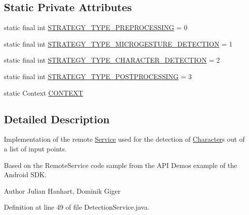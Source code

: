 \subsection*{Static Private Attributes}
\begin{DoxyCompactItemize}
\item 
static final int \hyperlink{classch_1_1zhaw_1_1ba10__bsha__1_1_1service_1_1DetectionService_a618391553bffc271f3d62fc4b1705c34}{STRATEGY\_\-TYPE\_\-PREPROCESSING} = 0
\item 
static final int \hyperlink{classch_1_1zhaw_1_1ba10__bsha__1_1_1service_1_1DetectionService_acc8c85d6fe896611e64180360f6150b3}{STRATEGY\_\-TYPE\_\-MICROGESTURE\_\-DETECTION} = 1
\item 
static final int \hyperlink{classch_1_1zhaw_1_1ba10__bsha__1_1_1service_1_1DetectionService_a79f9a08bcebfb07d97dad403931d011d}{STRATEGY\_\-TYPE\_\-CHARACTER\_\-DETECTION} = 2
\item 
static final int \hyperlink{classch_1_1zhaw_1_1ba10__bsha__1_1_1service_1_1DetectionService_a0a5532caf09d48e950372c1b0de3e328}{STRATEGY\_\-TYPE\_\-POSTPROCESSING} = 3
\item 
static Context \hyperlink{classch_1_1zhaw_1_1ba10__bsha__1_1_1service_1_1DetectionService_a0e249aa466d4da8bcac9f75942129aa6}{CONTEXT}
\end{DoxyCompactItemize}


\subsection{Detailed Description}
Implementation of the remote \hyperlink{}{Service} used for the detection of \hyperlink{classch_1_1zhaw_1_1ba10__bsha__1_1_1Character}{Character}s out of a list of input points.

Based on the RemoteService code sample from the API Demos example of the Android SDK.

\begin{DoxyAuthor}{Author}
Julian Hanhart, Dominik Giger 
\end{DoxyAuthor}


Definition at line 49 of file DetectionService.java.

